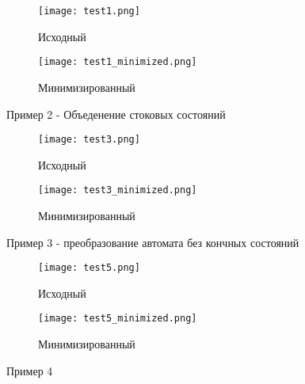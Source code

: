 \begin{figure}[h]
    \centering
    \begin{subfigure}[b]{0.6\linewidth}
      \texttt{[image: test1.png]}
      \caption{Исходный}
    \end{subfigure}
    \begin{subfigure}[b]{0.3\linewidth}
      \texttt{[image: test1\_minimized.png]}
      \caption{Минимизированный}
    \end{subfigure}
    \caption{Пример 2 - Объеденение стоковых состояний}
\end{figure}

\begin{figure}[h]
    \centering
    \begin{subfigure}[b]{0.6\linewidth}
      \texttt{[image: test3.png]}
      \caption{Исходный}
    \end{subfigure}
    \begin{subfigure}[b]{0.3\linewidth}
      \texttt{[image: test3\_minimized.png]}
      \caption{Минимизированный}
    \end{subfigure}
    \caption{Пример 3 - преобразование автомата без кончных состояний}
\end{figure}

\begin{figure}[h]
    \centering
    \begin{subfigure}[b]{0.8\linewidth}
      \texttt{[image: test5.png]}
      \caption{Исходный}
    \end{subfigure}
    \begin{subfigure}[b]{0.6\linewidth}
      \texttt{[image: test5\_minimized.png]}
      \caption{Минимизированный}
    \end{subfigure}
    \caption{Пример 4}
\end{figure}